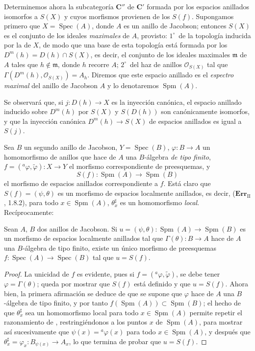 \begin{env}[10.9.3]
\label{IV.10.9.3}
Determinemos ahora la subcategoría $\boldsymbol{C}''$ de $\boldsymbol{C}'$ formada por los espacios anillados isomorfos a $S(X)$ y cuyos morfismos provienen de los $S(f)$.
Supongamos primero que $X=\operatorname{Spec}(A)$, donde $A$ es un anillo de Jacobson; entonces $S(X)$ es el conjunto de los ideales \emph{maximales} de $A$, provisto: $1^\circ$~de la topología inducida por la de $X$, de modo que una base de esta topología está formada por los $D^m(h)=D(h)\cap S(X)$, es decir, el conjunto de los ideales maximales $\mathfrak m$ de $A$ tales que $h\notin\mathfrak m$, donde $h$ recorre $A$; $2^\circ$~del haz de anillos $\mathcal O_{S(X)}$ tal que $\Gamma(D^m(h),\mathcal O_{S(X)})=A_h$.
Diremos que este espacio anillado es el \emph{espectro maximal} del anillo de Jacobson $A$ y lo denotaremos $\operatorname{Spm}(A)$.

Se observará que, si $j:D(h)\to X$ es la inyección canónica, el espacio anillado inducido sobre $D^m(h)$ por $S(X)$ y $S(D(h))$ son canónicamente isomorfos, y que la inyección canónica $D^m(h)\to S(X)$ de espacios anillados es igual a $S(j)$.

Sea $B$ un segundo anillo de Jacobson, $Y=\operatorname{Spec}(B)$, $\varphi:B\to A$ un homomorfismo de anillos que hace de $A$ una $B$-álgebra \emph{de tipo finito}, $f=({}^a\varphi,\widetilde\varphi):X\to Y$ el morfismo correspondiente de preesquemas, y
\[
  S(f):\operatorname{Spm}(A)\longrightarrow\operatorname{Spm}(B)
\]
el morfismo de espacios anillados correspondiente a $f$.
Está claro que $S(f)=(\psi,\theta)$ es un morfismo de espacios localmente anillados, es decir, ($\mathbf{Err}_{\mathrm{II}}$, 1.8.2), para todo $x\in\operatorname{Spm}(A)$, $\theta_x^\sharp$ es un homomorfismo \emph{local}.
Recíprocamente:
\end{env}

\begin{proposition}[10.9.4]
\label{IV.10.9.4}
Sean $A$, $B$ dos anillos de Jacobson.
Si $u=(\psi,\theta):\operatorname{Spm}(A)\to\operatorname{Spm}(B)$ es un morfismo de espacios localmente anillados tal que $\Gamma(\theta):B\to A$ hace de $A$ una $B$-álgebra de tipo finito, existe un único morfismo de preesquemas $f:\operatorname{Spec}(A)\to\operatorname{Spec}(B)$ tal que $u=S(f)$.
\end{proposition}

\begin{proof}
La unicidad de $f$ es evidente, pues si $f=({}^a\varphi,\widetilde\varphi)$, se debe tener $\varphi=\Gamma(\theta)$; queda por mostrar que $S(f)$ está definido y que $u=S(f)$.
Ahora bien, la primera afirmación se deduce de que se supone que $\varphi$ hace de $A$ una $B$-álgebra de tipo finito, y por tanto $f(\operatorname{Spm}(A))\subset\operatorname{Spm}(B)$; el hecho de que $\theta_x^\sharp$ sea un homomorfismo local para todo $x\in\operatorname{Spm}(A)$ permite repetir el razonamiento de , restringiéndonos a los puntos $x$ de $\operatorname{Spm}(A)$, para mostrar así sucesivamente que $\psi(x)={}^a\varphi(x)$ para todo $x\in\operatorname{Spm}(A)$, y después que $\theta_x^\sharp=\varphi_x:B_{\psi(x)}\to A_x$, lo que termina de probar que $u=S(f)$.
\end{proof}

